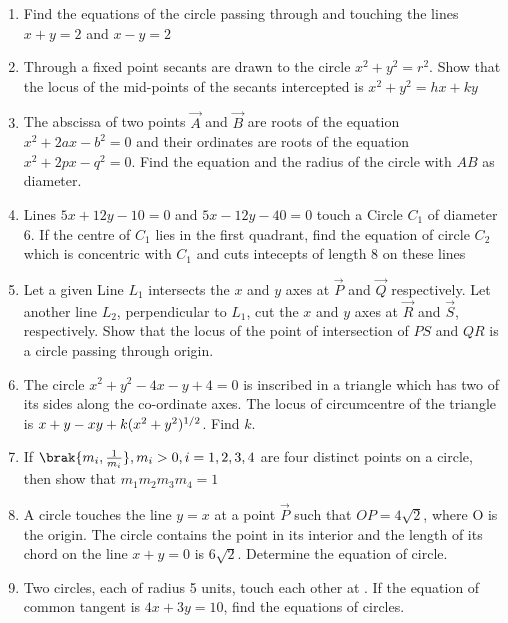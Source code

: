 \begin{enumerate}
\hfill {}
\item Find the equations of the circle passing through  and touching the lines $x+y=2$ and $x-y=2$

\hfill {}
\item Through a fixed point  secants are drawn to the circle $x^2+y^2=r^2$. Show that the locus of the mid-points of the secants intercepted is $x^2+y^2=hx+ky$

\hfill {}
\item The abscissa of two points $\vec{A}$ and $\vec{B}$ are roots of the equation $x^2+2ax-b^2=0$ and their ordinates are roots of the equation $x^2+2px-q^2=0$. Find the equation and the radius of the circle with $AB$ as diameter.

\hfill {}
\item Lines $5x+12y-10=0$ and $5x-12y-40=0$ touch a Circle $C_1$ of diameter 6. If the centre of $C_1$ lies in the first quadrant,  find the equation of circle $C_2$ which is concentric with $C_1$ and cuts intecepts of length 8 on these lines

\hfill {}
\item Let a given Line $L_1$ intersects the $x$ and $y$ axes at $\vec{P}$ and $\vec{Q}$ respectively. Let another line $L_2$,  perpendicular to $L_1$,  cut the $x$ and $y$ axes at $\vec{R}$ and $\vec{S}$,  respectively. Show that the locus of the point of intersection of $PS$ and $QR$ is a circle passing through origin.

\hfill {}
\item The circle $x^2+y^2-4x-y+4=0$ is inscribed in a triangle which has two of its sides along the co-ordinate axes. The locus of circumcentre of the triangle is $x+y-xy+k(x^2+y^2)\textsuperscript{1/2}$. Find $k$.

\hfill {}
\item If $\brak{ m_i,  \frac{1}{m_i}},  m_i > 0,  i = 1,  2,  3,  4$ are four distinct points on a circle,  then show that $m_1m_2m_3m_4=1$

\hfill {}
\item A circle touches the line $y=x$ at a point $\vec{P}$ such that $OP=4\sqrt{2}$,  where O is the origin. The circle contains the point  in its interior and the length of its chord on the line $x+y=0$ is $6\sqrt{2}$. Determine the equation of circle.

\hfill {}
\item Two circles,  each of radius 5 units,  touch each other at . If the equation of common tangent is $4x+3y=10$,  find the equations of circles.


\end{enumerate}
